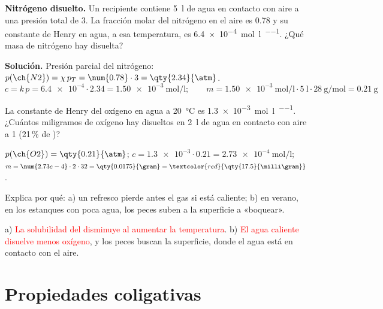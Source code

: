 \begin{example}
    \textbf{Nitrógeno disuelto.} Un recipiente contiene \qty{5}{\litre} de agua en contacto con aire a una presión total de
    \qty{3}{\atm}. La fracción molar del nitrógeno en el aire es \num{0.78} y su constante de Henry en agua, a esa temperatura,
    es \qty{6.4e-4}{\mol\per\litre\per\atm}. ¿Qué masa de nitrógeno hay disuelta?

    \textbf{Solución.} Presión parcial del nitrógeno: \(p(\ch{N2}) = \chi \, p_T = \num{0.78} \cdot 3 = \qty{2.34}{\atm}\).
    \[ c = k \, p = \num{6.4e-4} \cdot \num{2.34} = \qty{1.50e-3}{\mol\per\litre}; \qquad
    m = \qty{1.50e-3}{\mol\per\litre} \cdot \qty{5}{\litre} \cdot \qty{28}{\gram\per\mol} = \qty{0.21}{\gram} \]
\end{example}

\begin{exercise}
    La constante de Henry del oxígeno en agua a \qty{20}{\degreeCelsius} es \qty{1.3e-3}{\mol\per\litre\per\atm}. ¿Cuántos
    miligramos de oxígeno hay disueltos en \qty{2}{\litre} de agua en contacto con aire a \qty{1}{\atm} (21\,\% de )?
    \begin{solu}
        \(p(\ch{O2}) = \qty{0.21}{\atm}\); \(c = \num{1.3e-3} \cdot \num{0.21} = \qty{2.73e-4}{\mol\per\litre}\);
        \(m = \num{2.73e-4} \cdot 2 \cdot 32 = \qty{0.0175}{\gram} = \textcolor{red}{\qty{17.5}{\milli\gram}}\).
    \end{solu}
\end{exercise}

\begin{exercise}
    Explica por qué: a) un refresco pierde antes el gas si está caliente; b) en verano, en los estanques con poca agua, los peces
    suben a la superficie a «boquear».
    \begin{solu}
        a) \textcolor{red}{La solubilidad del  disminuye al aumentar la temperatura}. b) \textcolor{red}{El agua caliente
        disuelve menos oxígeno}, y los peces buscan la superficie, donde el agua está en contacto con el aire.
    \end{solu}
\end{exercise}

\section{Propiedades coligativas}\label{sec:ud2-coligativas}

